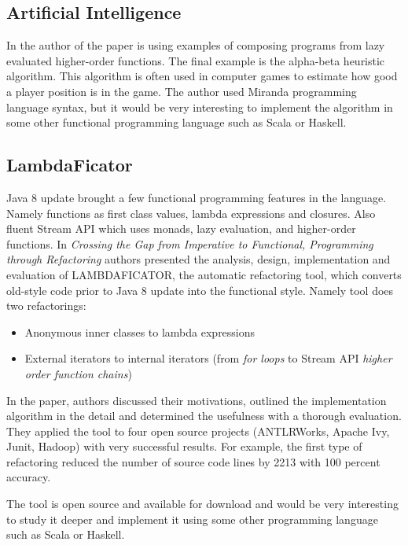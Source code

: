\documentclass[12pt,twoside,a4paper]{report}
\begin{document}
\subsection{Artificial Intelligence}\label{2.5.2}
In \cite{14} the author of the paper is using examples of composing programs from lazy evaluated higher-order functions. The final example is the alpha-beta heuristic algorithm. This algorithm is often used in computer games to estimate how good a player position is in the game. The author used Miranda programming language syntax, but it would be very interesting to implement the algorithm in some other functional programming language such as Scala or Haskell.
\subsection{LambdaFicator}\label{2.5.3}
Java 8 update brought a few functional programming features in the language. Namely functions as first class values, lambda expressions and closures. Also fluent Stream API which uses monads, lazy evaluation, and higher-order functions. In \emph{Crossing the Gap from Imperative to Functional, Programming through Refactoring}\cite{15} authors presented the analysis, design, implementation and evaluation of LAMBDAFICATOR, the automatic refactoring tool, which converts old-style code prior to Java 8 update into the functional style. Namely tool does two refactorings:
\begin{itemize}\itemsep1pt \parskip0pt 
\item Anonymous inner classes to lambda expressions
\item External iterators to internal iterators (from \textit{for loops} to Stream API \textit{higher order function chains})
\end{itemize}
In the paper, authors discussed their motivations, outlined the implementation algorithm in the detail and determined the usefulness with a thorough evaluation. They applied the tool to four open source projects (ANTLRWorks, Apache Ivy, Junit, Hadoop) with very successful results. For example, the first type of refactoring reduced the number of source code lines by 2213 with 100 percent accuracy.\par
The tool is open source and available for download and would be very interesting to study it deeper and implement it using some other programming language such as Scala or Haskell.
\end{document}
